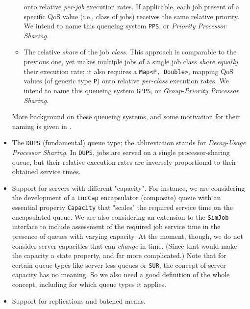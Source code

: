 \begin{itemize}
\begin{itemize}
                    onto relative {\em per-job\/} execution rates.
                  If applicable, each job present of a specific QoS value
                    (i.e., class of jobs) receives the same relative priority.
                  We intend to name this queueing system \lstinline|PPS|,
                    or {\em Priority Processor Sharing}.
            \item The relative {\em share\/} of the job {\em class}.
                  This approach is comparable to the previous one,
                    yet makes multiple jobs of a single job class
                    {\em share equally\/} their execution rate;
                    it also requires a \lstinline|Map<P, Double>|,
                    mapping QoS values (of generic type \lstinline|P|)
                    onto relative {\em per-class\/} execution rates.
                  We intend to name this queueing system \lstinline|GPPS|,
                    or {\em Group-Priority Processor Sharing}.
          \end{itemize}
        More background on these queueing systems,
          and some motivation for their naming is
          given in \cite{deJo2002}.
  \item The \lstinline|DUPS| (fundamental) queue type;
          the abbreviation stands for
          {\em Decay-Usage Processor Sharing}.
        In \lstinline|DUPS|,
          jobs are served on a single processor-sharing queue,
          but their relative execution rates
          are inversely proportional
          to their obtained service times.
  \item Support for servers with different "capacity".
        For instance, we are considering the
          development of a \lstinline|EncCap| encapsulator
          (composite) queue with an
          essential property \lstinline|Capacity|
          that "scales" the required service time on the
          encapsulated queue.
        We are also considering an extension to the
          \lstinline|SimJob| interface to
          include assessment of the required job service time
          in the presence of queues with varying capacity.
        At the moment, though, we do not consider
          server capacities that can {\em change\/} in time.
        (Since that would make the capacity a state property,
           and far more complicated.)
        Note that for certain queue types like
          server-less queues or \lstinline|SUR|,
          the concept of server capacity has no meaning.
        So we also need a good definition of the whole concept,
          including for which queue types it applies.
  \item Support for replications and batched means.
\end{itemize}
